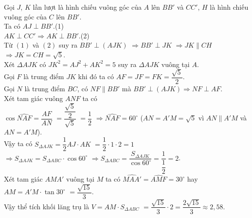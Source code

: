 \begin{bt}
{\begin{center}
		\end{center}
		\noindent Gọi $J$,  $K$ lần lượt là hình chiếu vuông góc của $A$ lên $BB'$ và $CC'$,  $H$ là hình chiếu vuông góc của $C$ lên $BB'$.\\
		Ta có $AJ\perp BB'$.\hfill (1)\\
		$AK\perp CC'\Rightarrow AK\perp BB'$.\hfill (2)\\
		Từ $(1)$ và $(2)$ suy ra $BB'\perp\left(AJK\right)$ $\Rightarrow BB'\perp JK$ $\Rightarrow JK\parallel CH$ $\Rightarrow JK=CH=\sqrt 5 $.\\
		Xét $\Delta AJK$ có $J{K^2}=A{J^2}+A{K^2}=5$ suy ra $\Delta AJK$ vuông tại $A$.\\
		Gọi $F$ là trung điểm $JK$ khi đó ta có $AF=JF=FK=\dfrac{\sqrt 5}{2}$.\\
		Gọi $N$ là trung điểm $BC$, có $NF\parallel BB'$ mà $BB'\perp\left(AJK\right)\Rightarrow NF\perp AF$.\\ Xét tam giác vuông $ANF$ ta có \\
		$\cos\widehat{NAF}=\dfrac{AF}{AN}$ $=\dfrac{\dfrac{\sqrt 5}{2}}{\sqrt 5}$ $=\dfrac{1}{2}$ $\Rightarrow\widehat{NAF}=60^\circ$  ($AN=A'M=\sqrt 5 $ vì $AN \parallel A'M$ và $AN=A'M$).\\
		Vậy ta có $S_{\Delta AJK}=\dfrac{1}{2}AJ\cdot AK$ $=\dfrac{1}{2}\cdot 1\cdot 2=1$\\ $\Rightarrow{S_{\Delta AJK}}=S_{\Delta ABC}\cdot \cos{60^\circ}$ $\Rightarrow{S_{\Delta ABC}}=\dfrac{S_{\Delta AJK}}{\cos{60^\circ}}=\dfrac{1}{\dfrac{1}{2}}=2$.\\
		Xét tam giác $AMA'$ vuông tại $M$ ta có $\widehat{MAA'}=\widehat{AMF}=30^\circ$ hay $AM=A'M\cdot \tan{30^\circ}$ $=\dfrac{\sqrt{15}}{3}$.\\
		Vậy thể tích khối lăng trụ là $V=AM\cdot S_{\Delta ABC}$ $=\dfrac{\sqrt{15}}{3}\cdot 2=\dfrac{2\sqrt{15}}{3}\approx 2{,}58$.}
\end{bt}

